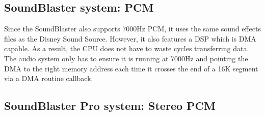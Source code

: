 \subsection{SoundBlaster system: PCM}
Since the SoundBlaster also supports 7000Hz PCM, it uses the same sound effects files as the Disney Sound Source. However, it also features a DSP which is DMA capable. As a result, the CPU does not have to waste cycles transferring data. The audio system only has to ensure it is running at 7000Hz and pointing the DMA to the right memory address each time it crosses the end of a 16K segment via a DMA routine callback.
\par








\par
\subsection{SoundBlaster Pro system: Stereo PCM}
\par

